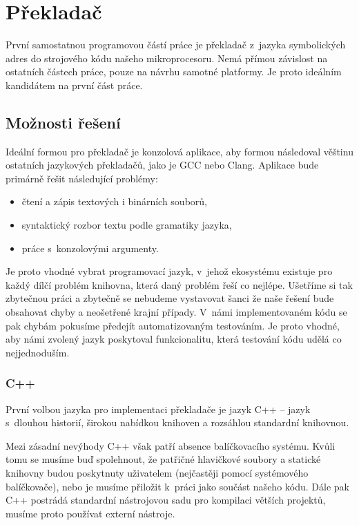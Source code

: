 \chapter{Překladač}
\label{chap:assembler}

První samostatnou programovou částí práce je překladač z~jazyka symbolických adres do strojového kódu našeho mikroprocesoru. Nemá přímou závislost na ostatních částech práce, pouze na návrhu samotné platformy. Je proto ideálním kandidátem na první část práce.

\section{Možnosti řešení}

Ideální formou pro překladač je konzolová aplikace, aby formou následoval věštinu ostatních jazykových překladačů, jako je GCC nebo Clang. Aplikace bude primárně řešit následující problémy:

\begin{itemize}
	\item čtení a zápis textových i binárních souborů,
	\item syntaktický rozbor textu podle gramatiky jazyka,
	\item práce s~konzolovými argumenty.
\end{itemize}

Je proto vhodné vybrat programovací jazyk, v~jehož ekosystému existuje pro každý dílčí problém knihovna, která daný problém řeší co nejlépe. Ušetříme si tak zbytečnou práci a zbytečně se nebudeme vystavovat šanci že naše řešení bude obsahovat chyby a neošetřené krajní případy. V~námi implementovaném kódu se pak chybám pokusíme předejít automatizovaným testováním. Je proto vhodné, aby námi zvolený jazyk poskytoval funkcionalitu, která testování kódu udělá co nejjednoduším.

\subsection{C++}
\label{sec:asm-cpp}

První volbou jazyka pro implementaci překladače je jazyk C++ -- jazyk s~dlouhou historií\cite{cpp-history}, širokou nabídkou knihoven a rozsáhlou standardní knihovnou.

Mezi zásadní nevýhody C++ však patří absence balíčkovacího systému. Kvůli tomu se musíme buď spolehnout, že patřičné hlavičkové soubory a statické knihovny budou poskytnuty uživatelem (nejčastěji pomocí systémového balíčkovače), nebo je musíme přiložit k~práci jako součást našeho kódu. Dále pak C++ postrádá standardní nástrojovou sadu pro kompilaci větších projektů, musíme proto používat externí nástroje.


